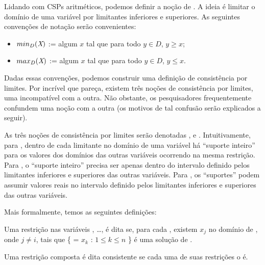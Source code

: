 Lidando com CSPs aritméticos, podemos definir a noção de . A ideia é limitar o domínio
de uma variável por limitantes inferiores e superiores. As seguintes convenções de notação serão convenientes:

\begin{itemize}
  \item $min_D(\textit{X})$ := algum $x$ tal que para todo $y \in D$, $y \geq x$;
  \item $max_D(\textit{X})$ := algum $x$ tal que para todo $y \in D$, $y  \leq x$.
\end{itemize}

Dadas essas convenções, podemos construir uma definição de consistência por limites. Por incrível
que pareça, existem três noções de consistência por limites, uma incompatível com a outra. Não
obstante, os pesquisadores frequentemente confundem uma noção com a outra (os motivos de tal
confusão serão explicados a seguir).

As três noções de consistência por limites serão denotadas \boundd, \boundz{} e \boundr.
Intuitivamente, para \boundd, dentro de cada limitante no domínio de uma variável há ``suporte
inteiro'' para os valores dos domínios das outras variáveis ocorrendo na mesma restrição.
Para \boundz, o ``suporte inteiro'' precisa ser apenas dentro do intervalo definido pelos limitantes
inferiores e superiores das outras variáveis.
Para \boundr, os ``suportes'' podem assumir valores reais no intervalo definido pelos limitantes
inferiores e superiores das outras variáveis.

Mais formalmente, temos as seguintes definições:

\begin{definition}
  Uma restrição  nas variáveis , \dots,  é dita
  se, para cada , existem  $x_j$ no domínio de , onde $j \neq i$, tais que \{ = $x_k$ : $1 \leq k \leq n$ \}
  é uma solução de .


  Uma restrição composta é dita \boundd{} consistente se cada uma de suas restrições o é.
\end{definition}

